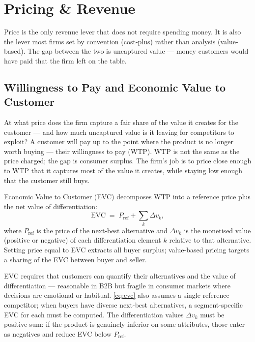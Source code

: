 \chapter{Pricing \& Revenue}\label{ch:pricing}


Price is the only revenue lever that does not require spending money. It is also the lever most firms set by convention (cost-plus) rather than analysis (value-based). The gap between the two is uncaptured value --- money customers would have paid that the firm left on the table.

\section{Willingness to Pay and Economic Value to Customer}\label{sec:evc}

At what price does the firm capture a fair share of the value it creates for the customer --- and how much uncaptured value is it leaving for competitors to exploit? A customer will pay up to the point where the product is no longer worth buying --- their willingness to pay (WTP). WTP is not the same as the price charged; the gap is consumer surplus. The firm's job is to price close enough to WTP that it captures most of the value it creates, while staying low enough that the customer still buys.

Economic Value to Customer (EVC) decomposes WTP into a reference price plus the net value of differentiation:
\begin{equation}\label{eq:evc}
  \mathrm{EVC} \;=\; P_{\text{ref}} + \sum_k \Delta v_k ,
\end{equation}
where \(P_{\text{ref}}\) is the price of the next-best alternative and \(\Delta v_k\) is the monetised value (positive or negative) of each differentiation element \(k\) relative to that alternative. Setting price equal to EVC extracts all buyer surplus; value-based pricing targets a sharing of the EVC between buyer and seller.

EVC requires that customers can quantify their alternatives and the value of differentiation --- reasonable in B2B but fragile in consumer markets where decisions are emotional or habitual. \cref{eq:evc} also assumes a single reference competitor; when buyers have diverse next-best alternatives, a segment-specific EVC for each must be computed. The differentiation values \(\Delta v_k\) must be positive-sum: if the product is genuinely inferior on some attributes, those enter as negatives and reduce EVC below \(P_{\text{ref}}\).

